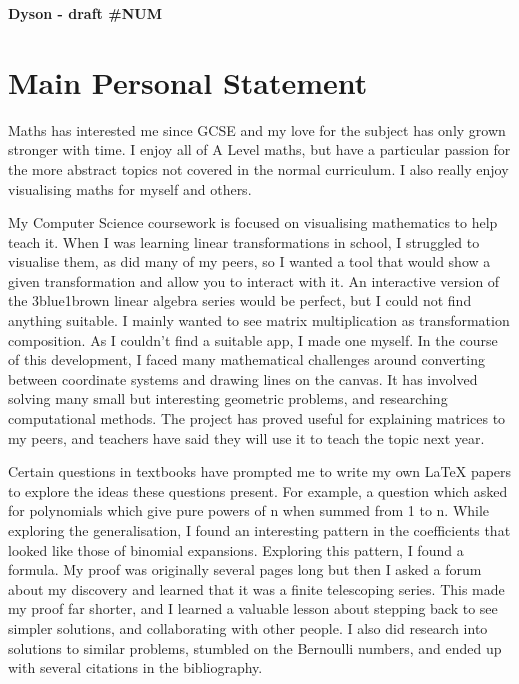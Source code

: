 \documentclass[a4paper, 12pt]{article}
\newenvironment{personalstatement}{\directlua{startPersonalStatement()}}{\directlua{stopPersonalStatement()}}
\begin{document}
\begin{center}
	\vspace*{3mm}
	\huge{\textbf{Dyson - draft \#NUM}}
\end{center}

\setlength{\parskip}{7.5ex}
\setlength{\parindent}{0em}

\vspace*{-12ex} %
\section*{Main Personal Statement}
\vspace*{-6ex}

\begin{personalstatement}
Maths has interested me since GCSE and my love for the subject has only grown stronger with time. I enjoy all of A Level maths, but have a particular passion for the more abstract topics not covered in the normal curriculum. I also really enjoy visualising maths for myself and others.

My Computer Science coursework is focused on visualising mathematics to help teach it. When I was learning linear transformations in school, I struggled to visualise them, as did many of my peers, so I wanted a tool that would show a given transformation and allow you to interact with it. An interactive version of the 3blue1brown linear algebra series would be perfect, but I could not find anything suitable. I mainly wanted to see matrix multiplication as transformation composition. As I couldn't find a suitable app, I made one myself. In the course of this development, I faced many mathematical challenges around converting between coordinate systems and drawing lines on the canvas. It has involved solving many small but interesting geometric problems, and researching computational methods. The project has proved useful for explaining matrices to my peers, and teachers have said they will use it to teach the topic next year.

Certain questions in textbooks have prompted me to write my own LaTeX papers to explore the ideas these questions present. For example, a question which asked for polynomials which give pure powers of n when summed from 1 to n. While exploring the generalisation, I found an interesting pattern in the coefficients that looked like those of binomial expansions. Exploring this pattern, I found a formula. My proof was originally several pages long but then I asked a forum about my discovery and learned that it was a finite telescoping series. This made my proof far shorter, and I learned a valuable lesson about stepping back to see simpler solutions, and collaborating with other people. I also did research into solutions to similar problems, stumbled on the Bernoulli numbers, and ended up with several citations in the bibliography.


\end{personalstatement}
\end{document}
